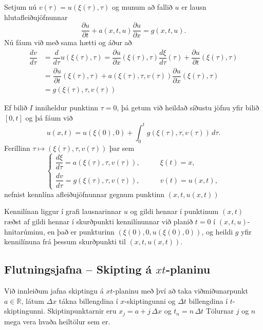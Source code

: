 \documentclass[icelandic,a4paper,12pt]{article}
\newcommand{\R}{{\mathbb  R}}
\begin{document}
Setjum nú $v(\tau)=u(\xi(\tau),\tau)$ og munum að
fallið $u$ er lausn hlutafleiðujöfnunnar
$$
\dfrac{\partial u}{\partial t}
+a(x,t,u)\dfrac{\partial u}{\partial x}=g(x,t,u).
$$
Nú fáum við með sama hætti og áður að
\begin{align*}
\dfrac{dv}{d\tau}&=\dfrac {d}{d\tau} u(\xi(\tau),\tau)= 
\dfrac{\partial u}{\partial x}(\xi(\tau),\tau) 
\dfrac{d\xi}{d\tau}(\tau)+
\dfrac{\partial u}{\partial t}(\xi(\tau),\tau)\\
&=\dfrac{\partial u}{\partial t}(\xi(\tau),\tau)
+a(\xi(\tau),\tau,v(\tau))
\dfrac{\partial u}{\partial x}(\xi(\tau),\tau) \\
&=g(\xi(\tau),\tau,v(\tau))  
\end{align*}



Ef bilið $I$ inniheldur punktinn $\tau=0$, þá getum við heildað
síðustu jöfnu yfir bilið $[0,t]$ og þá fáum við 
$$
u(x,t)=u(\xi(0),0)+\int_0^tg(\xi(\tau),\tau,v(\tau))\, d\tau.
$$
Ferillinn $\tau\mapsto (\xi(\tau),\tau,v(\tau))$ þar sem 
$$
\begin{cases}
  \dfrac{d\xi}{d\tau}=a(\xi(\tau),\tau,v(\tau)),&\qquad \xi(t)=x,\\
\dfrac{dv}{d\tau}=g(\xi(\tau),\tau,v(\tau)),& \qquad v(t)=u(x,t),
\end{cases}
$$
nefnist kennlína afleiðujöfnunnar gegnum punktinn $(x,t,u(x,t))$ 

\smallskip
Kennilínan liggur í grafi lausnarinnar $u$ og gildi hennar í punktinum 
$(x,t)$ ræðst af gildi hennar í skurðpunkti kennilínunnar við planið
$t=0$ í $(x,t,u)$-hnitarúminu, en það er punkturinn
$(\xi(0),0,u(\xi(0),0))$, og heildi $g$ yfir kennilínuna
frá þessum skurðpunkti til $(x,t,u(x,t))$.



\subsection{Flutningsjafna -- Skipting á $xt$-planinu} 
Við innleiðum jafna skiptingu á $xt$-planinu með því að taka
viðmiðunarpunkt  $a\in \R$, látum $\Delta x$ tákna billengdina í
$x$-skiptingunni og $\Delta t$ billengdina í  $t$-skiptingunni.
Skiptinpunktarnir eru $x_j=a+j\, \Delta x$ og $t_n=n\, \Delta t$
Tölurnar $j$ og $n$ mega vera hvaða heiltölur sem er.
\end{document}
